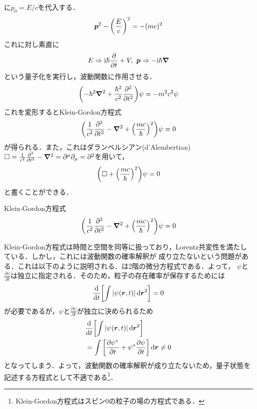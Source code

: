 \documentclass{report}
\begin{document}
に$p_0 = E/c$を代入する．
\begin{align}
  \bm{p}^2 - \qty(\frac{E}{c})^2 = -(mc)^2
\end{align}
これに対し素直に
\begin{align}
  E \Rightarrow \mathrm{i}\hbar\frac{\partial}{\partial t} + V,\ \bm{p} \Rightarrow -\mathrm{i}\hbar \grad 
\end{align}
という量子化を実行し，波動関数に作用させる．
\begin{align}
  \qty(-\hbar^2\grad^2 + \frac{\hbar^2}{c^2}\frac{\partial^2}{\partial t^2})\psi = -m^2c^2\psi
\end{align}
これを変形するとKlein-Gordon方程式
\begin{align}
  \qty(\frac{1}{c^2}\frac{\partial^2}{\partial t^2} - \grad^2 + \qty(\frac{mc}{\hbar})^2)\psi = 0 \label{Klein-Gordon-equation}
\end{align}
が得られる．また，これはダランベルシアン(d'Alembertian)$\Box = \frac{1}{c^2}\frac{\partial^2}{\partial t^2} - \grad^2 = \partial^\mu\partial_\mu = \partial^2$を用いて，
\begin{align}
  \qty(\Box + \qty(\frac{mc}{\hbar})^2)\psi = 0
\end{align}
と書くことができる．
\begin{itembox}[l]{Klein-Gordon方程式}
  \begin{equation}
    \qty(\frac{1}{c^2}\frac{\partial^2}{\partial t^2} - \grad^2 + \qty(\frac{mc}{\hbar})^2)\psi = 0
  \end{equation}
\end{itembox}
Klein-Gordon方程式は時間と空間を同等に扱っており，Lorentz共変性を満たしている．しかし，これには波動関数の確率解釈が
成り立たないという問題がある．これは以下のように説明される．は2階の微分方程式である．よって，
$\psi$と$\frac{\partial \psi}{\partial t}$は独立に指定される．そのため，粒子の存在確率が保存するためには
\begin{align}
  \frac{\mathrm{d}}{\dd{t}}\qty[\int \abs{\psi(\bm{r}, t)} \dd{\bm{r}}^2] = 0
\end{align}
が必要であるが，$\psi$と$\frac{\partial \psi}{\partial t}$が独立に決められるため
\begin{align}
  &\frac{\mathrm{d}}{\dd{t}}\qty[\int \abs{\psi(\bm{r}, t)} \dd{\bm{r}}^2]\\
  &= \int \qty[\frac{\partial \psi^{*}}{\partial t} + \psi^{*}\frac{\partial \psi}{\partial t}] \dd{\bm{r}} \neq 0
\end{align}
となってしまう．よって，波動関数の確率解釈が成り立たないため，量子状態を記述する方程式として不適である\footnote{Klein-Gordon方程式はスピン0の粒子の場の方程式である．}．
\end{document}

